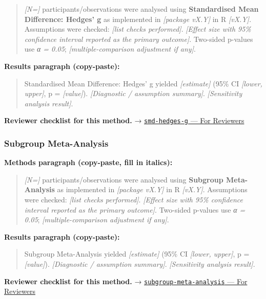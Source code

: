 \documentclass[
]{article}
\begin{document}
\begin{quote}
\emph{{[}N={]}} participants/observations were analysed using
\textbf{Standardised Mean Difference: Hedges' g} as implemented in
\emph{{[}package vX.Y{]}} in R \emph{{[}vX.Y{]}}. Assumptions were
checked: \emph{{[}list checks performed{]}}. \emph{{[}Effect size with
95\% confidence interval reported as the primary outcome{]}}. Two-sided
p-values use \emph{α = 0.05}; \emph{{[}multiple-comparison adjustment if
any{]}}.
\end{quote}

\textbf{Results paragraph (copy-paste):}

\begin{quote}
Standardised Mean Difference: Hedges' g yielded \emph{{[}estimate{]}}
(95\% CI \emph{{[}lower, upper{]}}, p = \emph{{[}value{]}}).
\emph{{[}Diagnostic / assumption summary{]}}. \emph{{[}Sensitivity
analysis result{]}}.
\end{quote}

\textbf{Reviewer checklist for this method.} →
\href{../chapters/15-metaanalysis/smd-hedges-g.Rmd\#for-reviewers}{\texttt{smd-hedges-g}
--- For Reviewers}

\subsubsection{Subgroup Meta-Analysis}\label{subgroup-meta-analysis}

\textbf{Methods paragraph (copy-paste, fill in italics):}

\begin{quote}
\emph{{[}N={]}} participants/observations were analysed using
\textbf{Subgroup Meta-Analysis} as implemented in \emph{{[}package
vX.Y{]}} in R \emph{{[}vX.Y{]}}. Assumptions were checked: \emph{{[}list
checks performed{]}}. \emph{{[}Effect size with 95\% confidence interval
reported as the primary outcome{]}}. Two-sided p-values use \emph{α =
0.05}; \emph{{[}multiple-comparison adjustment if any{]}}.
\end{quote}

\textbf{Results paragraph (copy-paste):}

\begin{quote}
Subgroup Meta-Analysis yielded \emph{{[}estimate{]}} (95\% CI
\emph{{[}lower, upper{]}}, p = \emph{{[}value{]}}). \emph{{[}Diagnostic
/ assumption summary{]}}. \emph{{[}Sensitivity analysis result{]}}.
\end{quote}

\textbf{Reviewer checklist for this method.} →
\href{../chapters/15-metaanalysis/subgroup-meta-analysis.Rmd\#for-reviewers}{\texttt{subgroup-meta-analysis}
--- For Reviewers}
\end{document}
